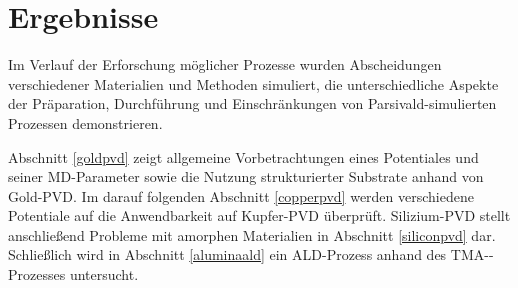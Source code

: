 \chapter{Ergebnisse}

Im Verlauf der Erforschung möglicher Prozesse wurden Abscheidungen verschiedener Materialien und Methoden simuliert, die unterschiedliche Aspekte der Präparation, Durchführung und Einschränkungen von Parsivald-simulierten Prozessen demonstrieren.

Abschnitt \ref{goldpvd} zeigt allgemeine Vorbetrachtungen eines Potentiales und seiner MD-Parameter sowie die Nutzung strukturierter Substrate anhand von Gold-PVD.
Im darauf folgenden Abschnitt \ref{copperpvd} werden verschiedene Potentiale auf die Anwendbarkeit auf Kupfer-PVD überprüft.
Silizium-PVD stellt anschließend Probleme mit amorphen Materialien in Abschnitt \ref{siliconpvd} dar.
Schließlich wird in Abschnitt \ref{aluminaald} ein ALD-Prozess anhand des TMA--Prozesses untersucht.


\clearpage

\clearpage

\clearpage

